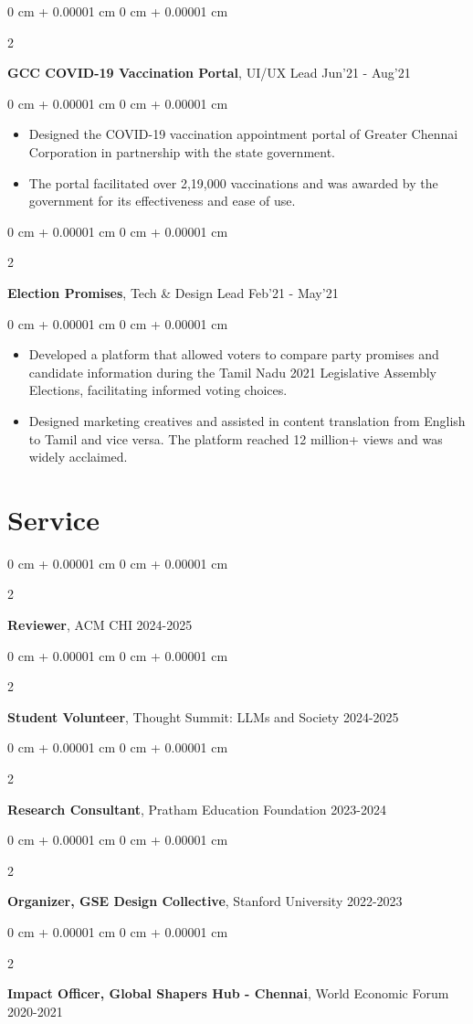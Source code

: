 \documentclass[10pt, letterpaper]{article}
\newenvironment{highlights}{
    \begin{itemize}[
        topsep=0.10 cm,
        parsep=0.10 cm,
        partopsep=0pt,
        itemsep=0pt,
        leftmargin=0 cm + 10pt
    ]
}{
    \end{itemize}
} %
\newenvironment{onecolentry}{
    \begin{adjustwidth}{
        0 cm + 0.00001 cm
    }{
        0 cm + 0.00001 cm
    }
}{
    \end{adjustwidth}
} %
\newenvironment{twocolentry}[2][]{
    \onecolentry
    \def\secondColumn{#2}
    \setcolumnwidth{\fill, 4.5 cm}
    \begin{paracol}{2}
}{
    \switchcolumn \raggedleft \secondColumn
    \end{paracol}
    \endonecolentry
} %
\newcommand{\datetext}[1]{\color{gray800}#1}
\newcommand{\socialimpactprojectentry}[3]{
    \begin{twocolentry}{
        \datetext{#3}
    }
        \textbf{#1}, #2\end{twocolentry}

    \vspace{0.10 cm}
}
\newcommand{\serviceentry}[3]{
    \begin{twocolentry}{
        \datetext{#3}
    }
        \textbf{#1}, #2\end{twocolentry}

    \vspace{0.10 cm}
}
\newcommand{\itemspacing}[1]{\vspace{0.275 cm}#1}
\begin{document}
        \socialimpactprojectentry{GCC COVID-19 Vaccination Portal}{UI/UX Lead}{Jun'21 - Aug'21}
            \begin{onecolentry}
                \begin{highlights}
                    \item  Designed the COVID-19 vaccination appointment portal of Greater Chennai Corporation in partnership with the state government.
                    \item The portal facilitated over 2,19,000 vaccinations and was awarded by the government for its effectiveness and ease of use. 
                \end{highlights}
            \end{onecolentry}
        
        \itemspacing

        \socialimpactprojectentry{Election Promises}{Tech \& Design Lead}{Feb'21 - May'21}
            \begin{onecolentry}
                \begin{highlights}
                    \item  Developed a platform that allowed voters to compare party promises and candidate information during the Tamil Nadu 2021 Legislative Assembly Elections, facilitating informed voting choices.
                    \item Designed marketing creatives and assisted in content translation from English to Tamil and vice versa. The platform reached 12 million+ views and was widely acclaimed. 
                \end{highlights}
            \end{onecolentry}


    \section{Service}

        \serviceentry{Reviewer}{ACM CHI}{2024-2025}
        \serviceentry{Student Volunteer}{Thought Summit: LLMs and Society}{2024-2025}
        \serviceentry{Research Consultant}{Pratham Education Foundation}{2023-2024}
        \serviceentry{Organizer, GSE Design Collective}{Stanford University}{2022-2023}
        \serviceentry{Impact Officer, Global Shapers Hub - Chennai}{World Economic Forum}{2020-2021}


    


    
\end{document}
